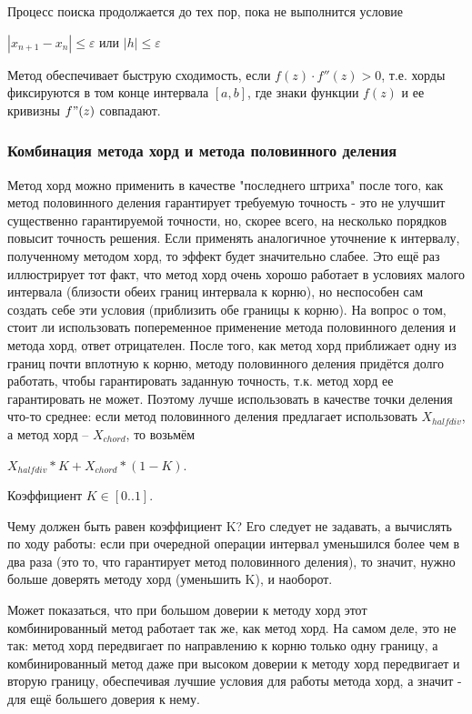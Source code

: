 \documentclass{article}
\begin{document}
				Процесс поиска продолжается до тех пор, пока не выполнится условие
				
				\begin{center}$|x_{n+1}-x_n| \le \varepsilon $ или $ |h| \le \varepsilon$
				\end{center}
				Метод обеспечивает быструю сходимость, если $f(z)\cdot f''(z) > 0$, т.е. хорды фиксируются в том конце интервала $[a,b]$, где знаки функции $f(z)$ и ее кривизны $f"(z)$ совпадают.
				
				\subsubsection{Комбинация метода хорд и метода половинного деления}
				
				Метод хорд можно применить в качестве "последнего штриха" после того, как метод половинного деления гарантирует требуемую точность - это не улучшит существенно гарантируемой точности, но, скорее всего, на несколько порядков повысит точность решения.
Если применять аналогичное уточнение к интервалу, полученному методом хорд, то эффект будет значительно слабее. Это ещё раз иллюстрирует тот факт, что метод хорд очень хорошо работает в условиях малого интервала (близости обеих границ интервала к корню), но неспособен сам создать себе эти условия (приблизить обе границы к корню).
				На вопрос о том, стоит ли использовать попеременное применение метода половинного деления и метода хорд, ответ отрицателен. После того, как метод хорд приближает одну из границ почти вплотную к корню, методу половинного деления придётся долго работать, чтобы гарантировать заданную точность, т.к. метод хорд ее гарантировать не может.
				Поэтому лучше использовать в качестве точки деления что-то среднее: если метод половинного деления предлагает использовать $X_{halfdiv}$, а метод хорд -- $X_{chord}$, то возьмём \begin{center}$X_{halfdiv}*K+X_{chord}*(1-K)$.\end{center} Коэффициент $K \in [0..1]$.
				
				Чему должен быть равен коэффициент K? Его следует не задавать, а вычислять по ходу работы: если при очередной операции интервал уменьшился более чем в два раза (это то, что гарантирует метод половинного деления), то значит, нужно больше доверять методу хорд (уменьшить K), и наоборот.
				
				Может показаться, что при большом доверии к методу хорд этот комбинированный метод работает так же, как метод хорд. На самом деле, это не так: метод хорд передвигает по направлению к корню только одну границу, а комбинированный метод даже при высоком доверии к методу хорд передвигает и вторую границу, обеспечивая лучшие условия для работы метода хорд, а значит - для ещё большего доверия к нему.
\end{document}
